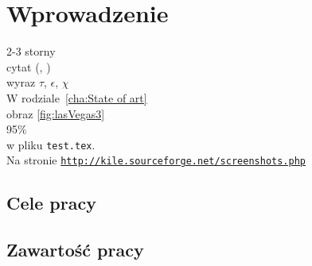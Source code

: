 \chapter{Wprowadzenie}
\label{cha:wprowadzenie}

2-3 storny\\
cytat (\cite{Dil00}, \cite{Lam92})\\
wyraz $\tau$, $\epsilon$, $\chi$\\
W rodziale~\ref{cha:State of art}\\
obraz \ref{fig:lasVegas3}\\
95\%\\
w pliku \texttt{test.tex}.\\
Na stronie \underline{\texttt{http://kile.sourceforge.net/screenshots.php}}\\

\section{Cele pracy}
\label{sec:celePracy}


\section{Zawartość pracy}
\label{sec:zawartoscPracy}



















